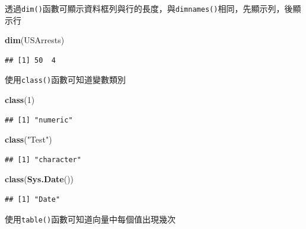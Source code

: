 \documentclass[]{book}
\newenvironment{Shaded}{\begin{snugshade}}{\end{snugshade}}
\newcommand{\KeywordTok}[1]{\textcolor[rgb]{0.13,0.29,0.53}{\textbf{{#1}}}}
\newcommand{\DecValTok}[1]{\textcolor[rgb]{0.00,0.00,0.81}{{#1}}}
\newcommand{\StringTok}[1]{\textcolor[rgb]{0.31,0.60,0.02}{{#1}}}
\newcommand{\NormalTok}[1]{{#1}}
\theoremstyle{definition}
\theoremstyle{definition}
\theoremstyle{remark}
\begin{document}
透過\texttt{dim()}函數可顯示資料框列與行的長度，與\texttt{dimnames()}相同，先顯示列，後顯示行

\begin{Shaded}
\begin{Highlighting}[]
\KeywordTok{dim}\NormalTok{(USArrests) }
\end{Highlighting}
\end{Shaded}

\begin{verbatim}
## [1] 50  4
\end{verbatim}

使用\texttt{class()}函數可知道變數類別

\begin{Shaded}
\begin{Highlighting}[]
\KeywordTok{class}\NormalTok{(}\DecValTok{1}\NormalTok{)}
\end{Highlighting}
\end{Shaded}

\begin{verbatim}
## [1] "numeric"
\end{verbatim}

\begin{Shaded}
\begin{Highlighting}[]
\KeywordTok{class}\NormalTok{(}\StringTok{"Test"}\NormalTok{)}
\end{Highlighting}
\end{Shaded}

\begin{verbatim}
## [1] "character"
\end{verbatim}

\begin{Shaded}
\begin{Highlighting}[]
\KeywordTok{class}\NormalTok{(}\KeywordTok{Sys.Date}\NormalTok{())}
\end{Highlighting}
\end{Shaded}

\begin{verbatim}
## [1] "Date"
\end{verbatim}

使用\texttt{table()}函數可知道向量中每個值出現幾次

\begin{Shaded}
\end{Shaded}
\end{document}
